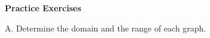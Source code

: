 \def\figdir{/storage/emulated/0/Documents/documents/latex/1920/Grade-8/2nd/domain-and-range-of-a-function/f}

\textbf{Practice Exercises}

\vspce

A. Determine the domain and the range of each graph.
\begin{enumerate}[label = \arabic*. ]
\begin{multicols}{2}
\item  
\item  
\item  
\item  
\item  
\item  
\end{multicols} 
\end{enumerate}  